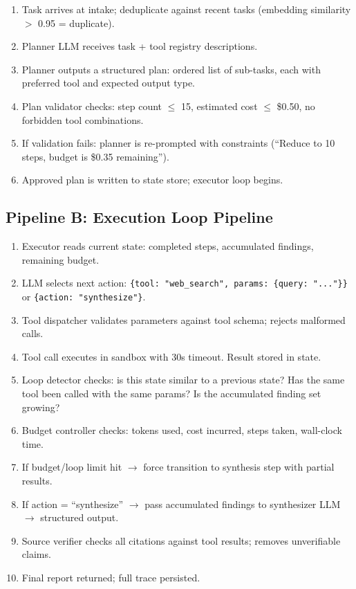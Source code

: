 \begin{enumerate}
  \item Task arrives at intake; deduplicate against recent tasks (embedding similarity $>$ 0.95 = duplicate).
  \item Planner LLM receives task + tool registry descriptions.
  \item Planner outputs a structured plan: ordered list of sub-tasks, each with preferred tool and expected output type.
  \item Plan validator checks: step count $\leq$ 15, estimated cost $\leq$ \$0.50, no forbidden tool combinations.
  \item If validation fails: planner is re-prompted with constraints (``Reduce to 10 steps, budget is \$0.35 remaining'').
  \item Approved plan is written to state store; executor loop begins.
\end{enumerate}

\subsection*{Pipeline B: Execution Loop Pipeline}

\begin{enumerate}
  \item Executor reads current state: completed steps, accumulated findings, remaining budget.
  \item LLM selects next action: \texttt{\{tool: "web\_search", params: \{query: "..."\}\}} or \texttt{\{action: "synthesize"\}}.
  \item Tool dispatcher validates parameters against tool schema; rejects malformed calls.
  \item Tool call executes in sandbox with 30s timeout. Result stored in state.
  \item Loop detector checks: is this state similar to a previous state? Has the same tool been called with the same params? Is the accumulated finding set growing?
  \item Budget controller checks: tokens used, cost incurred, steps taken, wall-clock time.
  \item If budget/loop limit hit $\rightarrow$ force transition to synthesis step with partial results.
  \item If action = ``synthesize'' $\rightarrow$ pass accumulated findings to synthesizer LLM $\rightarrow$ structured output.
  \item Source verifier checks all citations against tool results; removes unverifiable claims.
  \item Final report returned; full trace persisted.
\end{enumerate}

